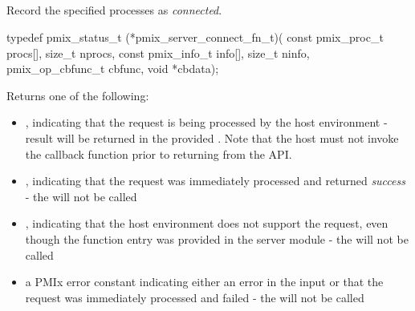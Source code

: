 %
%


\subsection{}

\summary

Record the specified processes as \textit{connected}.

\format

\cspecificstart
\begin{codepar}
typedef pmix_status_t (*pmix_server_connect_fn_t)(
                             const pmix_proc_t procs[],
                             size_t nprocs,
                             const pmix_info_t info[],
                             size_t ninfo,
                             pmix_op_cbfunc_t cbfunc,
                             void *cbdata);
\end{codepar}
\cspecificend

\begin{arglist}
\end{arglist}

Returns one of the following:

\begin{itemize}
    \item {}, indicating that the request is being processed by the host environment - result will be returned in the provided . Note that the host must not invoke the callback function prior to returning from the \ac{API}.
    \item {}, indicating that the request was immediately processed and returned \textit{success} - the  will not be called
    \item {}, indicating that the host environment does not support the request, even though the function entry was provided in the server module - the  will not be called
    \item a PMIx error constant indicating either an error in the input or that the request was immediately processed and failed - the  will not be called
\end{itemize}

